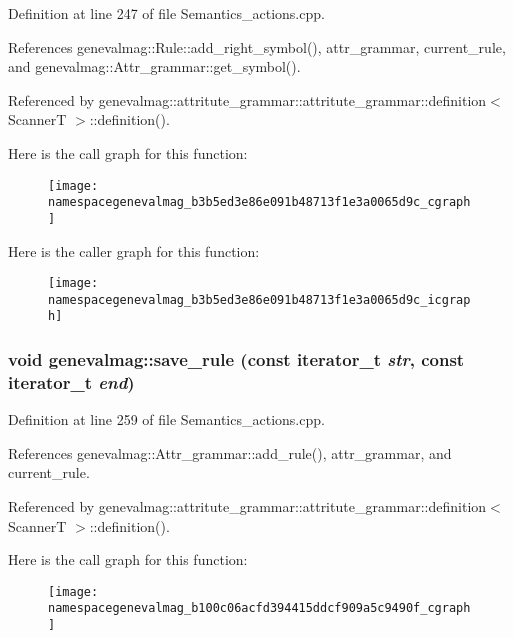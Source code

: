 Definition at line 247 of file Semantics\_\-actions.cpp.

References genevalmag::Rule::add\_\-right\_\-symbol(), attr\_\-grammar, current\_\-rule, and genevalmag::Attr\_\-grammar::get\_\-symbol().

Referenced by genevalmag::attritute\_\-grammar::attritute\_\-grammar::definition$<$ ScannerT $>$::definition().

Here is the call graph for this function:\nopagebreak
\begin{figure}[H]
\begin{center}
\leavevmode
\texttt{[image: namespacegenevalmag\_b3b5ed3e86e091b48713f1e3a0065d9c\_cgraph]}
\end{center}
\end{figure}


Here is the caller graph for this function:\nopagebreak
\begin{figure}[H]
\begin{center}
\leavevmode
\texttt{[image: namespacegenevalmag\_b3b5ed3e86e091b48713f1e3a0065d9c\_icgraph]}
\end{center}
\end{figure}
\hypertarget{namespacegenevalmag_b100c06acfd394415ddcf909a5c9490f}{
\subsubsection[{save\_\-rule}]{\setlength{\rightskip}{0pt plus 5cm}void genevalmag::save\_\-rule (const iterator\_\-t {\em str}, \/  const iterator\_\-t {\em end})}}
\label{namespacegenevalmag_b100c06acfd394415ddcf909a5c9490f}




Definition at line 259 of file Semantics\_\-actions.cpp.

References genevalmag::Attr\_\-grammar::add\_\-rule(), attr\_\-grammar, and current\_\-rule.

Referenced by genevalmag::attritute\_\-grammar::attritute\_\-grammar::definition$<$ ScannerT $>$::definition().

Here is the call graph for this function:\nopagebreak
\begin{figure}[H]
\begin{center}
\leavevmode
\texttt{[image: namespacegenevalmag\_b100c06acfd394415ddcf909a5c9490f\_cgraph]}
\end{center}
\end{figure}


